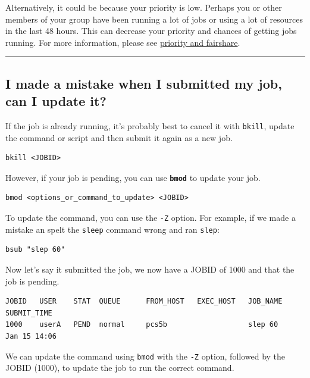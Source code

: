 \documentclass[11pt]{article}
\begin{document}
Alternatively, it could be because your priority is low. Perhaps you or
other members of your group have been running a lot of jobs or using a
lot of resources in the last 48 hours. This can decrease your priority
and chances of getting jobs running. For more information, please see
\href{priority_and_fairshare.ipynb}{priority and fairshare}.

    \begin{center}\rule{0.5\linewidth}{\linethickness}\end{center}

    \subsection{I made a mistake when I submitted my job, can I update
it?}\label{i-made-a-mistake-when-i-submitted-my-job-can-i-update-it}

If the job is already running, it's probably best to cancel it with
\texttt{bkill}, update the command or script and then submit it again as
a new job.

    \begin{verbatim}
bkill <JOBID>
\end{verbatim}

    However, if your job is pending, you can use \textbf{\texttt{bmod}} to
update your job.

    \begin{verbatim}
bmod <options_or_command_to_update> <JOBID>
\end{verbatim}

    To update the command, you can use the \texttt{-Z} option. For example,
if we made a mistake an spelt the \texttt{sleep} command wrong and ran
\texttt{slep}:

    \begin{verbatim}
bsub "slep 60"
\end{verbatim}

    Now let's say it submitted the job, we now have a JOBID of 1000 and that
the job is pending.

    \begin{verbatim}
JOBID   USER    STAT  QUEUE      FROM_HOST   EXEC_HOST   JOB_NAME   SUBMIT_TIME
1000    userA   PEND  normal     pcs5b                   slep 60    Jan 15 14:06
\end{verbatim}

    We can update the command using \texttt{bmod} with the \texttt{-Z}
option, followed by the JOBID (1000), to update the job to run the
correct command.
\end{document}
